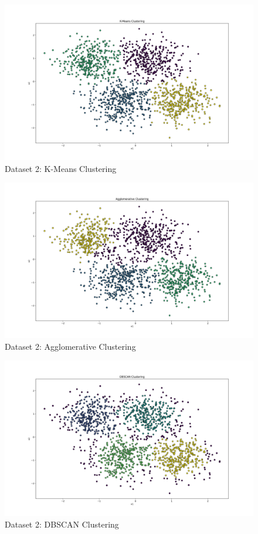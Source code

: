 \clearpage

\begin{figure}[H]
	\centering
	\includegraphics[width=0.9\linewidth]{Images/Clusters-5-v1-K-Means Clustering.png}
	\caption{Dataset 2: K-Means Clustering}
	\label{fig:clusters-5-v1-k-means-clustering}
\end{figure}

\begin{figure}[H]
	\centering
	\includegraphics[width=0.9\linewidth]{Images/Clusters-5-v1-Agglomerative Clustering.png}
	\caption{Dataset 2: Agglomerative Clustering}
	\label{fig:clusters-5-v1-agglomerative-clustering}
\end{figure}

\begin{figure}[H]
	\centering
	\includegraphics[width=0.9\linewidth]{Images/Clusters-5-v1-DBSCAN Clustering.png}
	\caption{Dataset 2: DBSCAN Clustering}
	\label{fig:clusters-5-v1-dbscan-clustering}
\end{figure}

